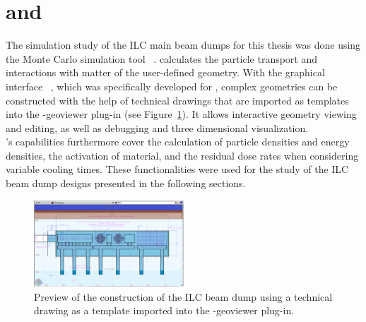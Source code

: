\section{\fluka and \flair}
\label{BeamDumps:fluka}
The simulation study of the ILC main beam dumps for this thesis was done using the Monte Carlo simulation tool \fluka~\cite{FLUKA,FLUKA2}.
\fluka calculates the particle transport and interactions with matter of the user-defined geometry.
With the graphical interface \flair~\cite{FLAIR}, which was specifically developed for \fluka, complex geometries can be constructed with the help of technical drawings that are imported as templates into the \flair-geoviewer plug-in (see Figure~\ref{fig:BeamDumps:geoviewer}).
It allows interactive geometry viewing and editing, as well as debugging and three dimensional visualization.
\\\fluka's capabilities furthermore cover the calculation of particle densities and energy densities, the activation of material, and the residual dose rates when considering variable cooling times.
These functionalities were used for the study of the ILC beam dump designs presented in the following sections.
\begin{figure}[hbp]
\centering
\includegraphics[width=0.5\textwidth]{Figures/BeamDump/Design2_geometry_drawing_xz.png}
\caption[Preview of the geometry construction in \flair]{Preview of the construction of the ILC beam dump using a technical drawing as a template imported into the \flair-geoviewer plug-in.}
\label{fig:BeamDumps:geoviewer}
\end{figure}

